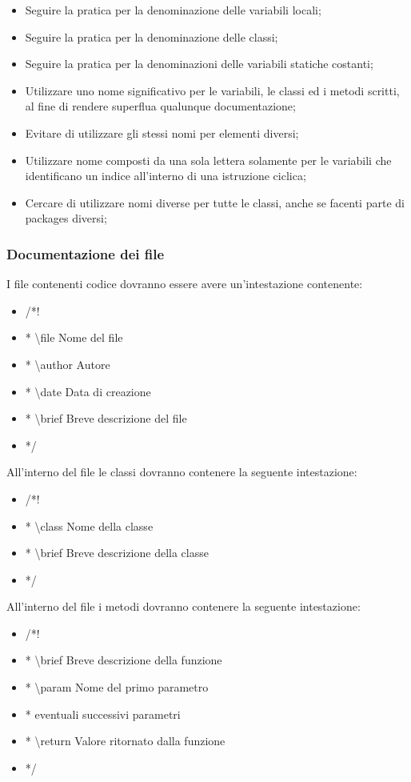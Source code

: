 \begin{itemize}
\item Seguire la pratica  per la denominazione delle variabili locali;
\item Seguire la pratica  per la denominazione delle classi;
\item Seguire la pratica  per la denominazioni delle variabili statiche costanti;
\item Utilizzare uno nome significativo per le variabili, le classi ed i metodi scritti, al fine di rendere superflua qualunque documentazione;
\item Evitare di utilizzare gli stessi nomi per elementi diversi;
\item Utilizzare nome composti da una sola lettera solamente per le variabili che identificano un indice all'interno di una istruzione ciclica;
\item Cercare di utilizzare nomi diverse per tutte le classi, anche se facenti parte di packages diversi;
\end{itemize}
\subsubsection{Documentazione dei file}
I file contenenti codice dovranno essere avere un’intestazione contenente:
\begin{itemize}
\color{ForestGreen}
\item /*! 
\item *   \textbackslash file Nome del file
\item *   \textbackslash author Autore
\item *   \textbackslash date Data di creazione
\item *   \textbackslash brief Breve descrizione del file
\item */
\end{itemize}

All'interno del file le classi dovranno contenere la seguente intestazione:
\begin{itemize}
\color{ForestGreen}
\item /*!
\item * \textbackslash class Nome della classe
\item * \textbackslash brief Breve descrizione della classe
\item */
\end{itemize}

All'interno del file i metodi dovranno contenere la seguente intestazione:
\begin{itemize}
\color{ForestGreen}
\item /*!
\item * \textbackslash brief Breve descrizione della funzione
\item * \textbackslash param Nome del primo parametro
\item *  eventuali successivi parametri
\item * \textbackslash return Valore ritornato dalla funzione
\item */
\end{itemize}
  
